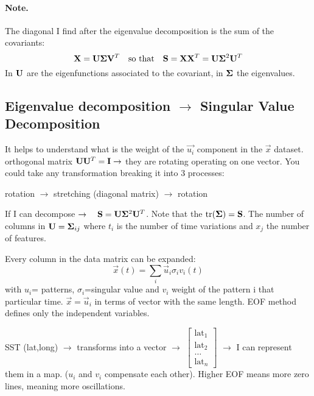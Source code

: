 \paragraph{Note.} The diagonal I find after the eigenvalue decomposition is the sum of the covariants:
\[
	\mathbf{X} = \mathbf{U} \mathbf{\Sigma} \mathbf{V}^T \quad \text{so that} \quad \mathbf{S}=\mathbf{X}\mathbf{X}^T=\mathbf{U} \mathbf{\Sigma}^2 \mathbf{U}^T
\]
In $\mathbf{U}$ are the eigenfunctions associated to the covariant, in $\mathbf{\Sigma}$ the eigenvalues.

\subsection{Eigenvalue decomposition $\rightarrow$ Singular Value Decomposition}
\label{subsec:svd}
It helps to understand what is the weight of the $\vec{u_i}$ component in the $\vec{x}$ dataset.
\\


orthogonal matrix $\mathbf{U}\mathbf{U}^T= \mathbf{I} \rightarrow$ they are rotating operating on one vector. You could take any transformation breaking it into 3 processes:
\begin{center}
	rotation $\rightarrow$ stretching (diagonal matrix) $\rightarrow$ rotation
\end{center}
If I can decompose $\rightarrow \quad \mathbf{S}=\mathbf{U} \mathbf{\Sigma}^2 \mathbf{U}^T$.
Note that the $\text{tr}(\mathbf{\Sigma})=\mathbf{S}$.
The number of columns in $\mathbf{U}= \mathbf{\Sigma}_{ij}$ where $t_i$ is the number of time variations and $x_j$ the number of features.

Every column in the data matrix can be expanded:
\begin{equation*}
	\vec{x}(t)=\sum_i \vec{u}_i \sigma_i v_i(t)
\end{equation*}
with $u_i$= patterns, $\sigma_i$=singular value and $v_i$ weight of the pattern i that particular time. $\vec{x}=\vec{u}_i$ in terms of vector with the same length. EOF method defines only the independent variables.

SST (lat,long) $\rightarrow$ transforms into a vector $\rightarrow$ $\begin{bmatrix}
		\text{lat}_1 \\
		\text{lat}_2 \\
		\dots        \\
		\text{lat}_n
	\end{bmatrix}$ $\rightarrow$ I can represent them in a map.
($u_i$ and $v_i$ compensate each other).
Higher EOF means more zero lines, meaning more oscillations.

